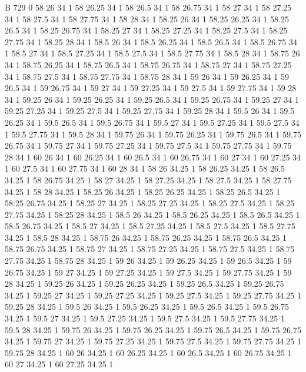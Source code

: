 
 

B	729	0   
58 26 34 1
58 26.25 34 1
58 26.5 34 1
58 26.75 34 1
58 27 34 1
58 27.25 34 1
58 27.5 34 1
58 27.75 34 1
58 28 34 1
58.25 26 34 1
58.25 26.25 34 1
58.25 26.5 34 1
58.25 26.75 34 1
58.25 27 34 1
58.25 27.25 34 1
58.25 27.5 34 1
58.25 27.75 34 1
58.25 28 34 1
58.5 26 34 1
58.5 26.25 34 1
58.5 26.5 34 1
58.5 26.75 34 1
58.5 27 34 1
58.5 27.25 34 1
58.5 27.5 34 1
58.5 27.75 34 1
58.5 28 34 1
58.75 26 34 1
58.75 26.25 34 1
58.75 26.5 34 1
58.75 26.75 34 1
58.75 27 34 1
58.75 27.25 34 1
58.75 27.5 34 1
58.75 27.75 34 1
58.75 28 34 1
59 26 34 1
59 26.25 34 1
59 26.5 34 1
59 26.75 34 1
59 27 34 1
59 27.25 34 1
59 27.5 34 1
59 27.75 34 1
59 28 34 1
59.25 26 34 1
59.25 26.25 34 1
59.25 26.5 34 1
59.25 26.75 34 1
59.25 27 34 1
59.25 27.25 34 1
59.25 27.5 34 1
59.25 27.75 34 1
59.25 28 34 1
59.5 26 34 1
59.5 26.25 34 1
59.5 26.5 34 1
59.5 26.75 34 1
59.5 27 34 1
59.5 27.25 34 1
59.5 27.5 34 1
59.5 27.75 34 1
59.5 28 34 1
59.75 26 34 1
59.75 26.25 34 1
59.75 26.5 34 1
59.75 26.75 34 1
59.75 27 34 1
59.75 27.25 34 1
59.75 27.5 34 1
59.75 27.75 34 1
59.75 28 34 1
60 26 34 1
60 26.25 34 1
60 26.5 34 1
60 26.75 34 1
60 27 34 1
60 27.25 34 1
60 27.5 34 1
60 27.75 34 1
60 28 34 1
58 26 34.25 1
58 26.25 34.25 1
58 26.5 34.25 1
58 26.75 34.25 1
58 27 34.25 1
58 27.25 34.25 1
58 27.5 34.25 1
58 27.75 34.25 1
58 28 34.25 1
58.25 26 34.25 1
58.25 26.25 34.25 1
58.25 26.5 34.25 1
58.25 26.75 34.25 1
58.25 27 34.25 1
58.25 27.25 34.25 1
58.25 27.5 34.25 1
58.25 27.75 34.25 1
58.25 28 34.25 1
58.5 26 34.25 1
58.5 26.25 34.25 1
58.5 26.5 34.25 1
58.5 26.75 34.25 1
58.5 27 34.25 1
58.5 27.25 34.25 1
58.5 27.5 34.25 1
58.5 27.75 34.25 1
58.5 28 34.25 1
58.75 26 34.25 1
58.75 26.25 34.25 1
58.75 26.5 34.25 1
58.75 26.75 34.25 1
58.75 27 34.25 1
58.75 27.25 34.25 1
58.75 27.5 34.25 1
58.75 27.75 34.25 1
58.75 28 34.25 1
59 26 34.25 1
59 26.25 34.25 1
59 26.5 34.25 1
59 26.75 34.25 1
59 27 34.25 1
59 27.25 34.25 1
59 27.5 34.25 1
59 27.75 34.25 1
59 28 34.25 1
59.25 26 34.25 1
59.25 26.25 34.25 1
59.25 26.5 34.25 1
59.25 26.75 34.25 1
59.25 27 34.25 1
59.25 27.25 34.25 1
59.25 27.5 34.25 1
59.25 27.75 34.25 1
59.25 28 34.25 1
59.5 26 34.25 1
59.5 26.25 34.25 1
59.5 26.5 34.25 1
59.5 26.75 34.25 1
59.5 27 34.25 1
59.5 27.25 34.25 1
59.5 27.5 34.25 1
59.5 27.75 34.25 1
59.5 28 34.25 1
59.75 26 34.25 1
59.75 26.25 34.25 1
59.75 26.5 34.25 1
59.75 26.75 34.25 1
59.75 27 34.25 1
59.75 27.25 34.25 1
59.75 27.5 34.25 1
59.75 27.75 34.25 1
59.75 28 34.25 1
60 26 34.25 1
60 26.25 34.25 1
60 26.5 34.25 1
60 26.75 34.25 1
60 27 34.25 1
60 27.25 34.25 1

